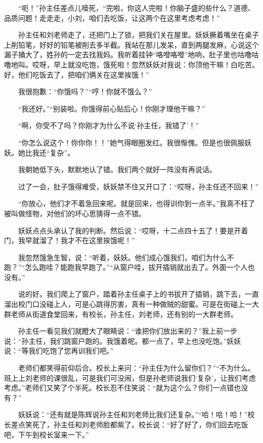  　　“呃！”孙主任差点儿噎死，“完啦，你这人完啦！你脑子盛的些什么？道德、品质问题！走走走，小刘，咱们去吃饭，让这两个在这里考虑考虑！” 
 
 　　孙主任和刘老师走了，还把门上了锁，把我们关在屋里。妖妖撅着嘴坐在桌子上削铅笔，好好的铅笔被削去多半截。我站在那儿发呆，直到两腿发麻，心说这个漏子捅大了，姓孙的一定去找我妈。我听着挂钟“咯噔咯噔”地响，肚子里也咕噜咕噜地叫。哎呀，早上就没吃饱，饿死啦！忽然妖妖对我说：你顶他干嘛！白吃苦。好，他们吃饭去了，把咱们俩关在这里挨饿！” 
 
 　　我很抱歉：“你饿吗？”“哼！你就不饿么？” 
 
 　　“我还好。”“别装啦。你饿得前心贴后心！你刚才理他干嘛？” 
 
 　　“啊，你受不了吗？你刚才为什么不说‘孙主任，我错了’！” 
 
 　　“你怎么说这个！你你你！！”她气得眼圈发红。我很惭愧。但是也很佩服妖妖。她比我还“复杂”。 
 
 　　我朝她低下头，默默地认了错。我们两个就好一阵没有再说话。 
 
 　　过了一会，肚子饿得难受，妖妖禁不住又开口了：“哎呀，孙主任还不回来！” 
 
 　　“你放心，他们才不着急回来呢。就是回来，也得训你到一点半。”我真不枉了被叫做怪物，对他们的坏心思猜得一点不错。 
 
 　　妖妖点点头承认了我的判断。然后说：“哎呀，十二点四十五了！要是开着门，我早就溜了！我才不在这里挨饿呢！” 
 
 　　我忽然饿急生智，说：“听着，妖妖。他们成心饿我们，咱们为什么不跑？”“怎么跑哇？能跑我早跑了。”“从窗户哇，拔开插销就出去了。外面一个人也没有。” 
 
 　　说的好。我们爬上了窗户，踏着孙主任桌子上的书拔开了插销，跳下去，一直溜出校门口没碰上人，可是心跳得厉害，真有一种做贼的甜蜜。可是在街碰上一大群老师从街道食堂回来，有校长，孙主任，刘老师，还有别的一大群老师。 
 
 　　孙主任一看见我们就瞪大了眼睛说：“谁把你们放出来的？”我上前一步说：“孙主任，我们跳窗户跑的。我饿着呢。都一点了，早上也没吃饱。”妖妖说：“等我们吃饱了您再训我们吧。” 
 
 　　老师们都笑得前仰后合。校长上来问：“孙主任为什么留你们？”“不为什么。班上上刘老师的课很乱，可是我们可没闹，但是孙老师说我们‘复杂’，让我们考虑考虑。”老师们又笑了个半死。校长忍不住笑说：“就为这个么？你们一点错也没有？” 
 
 　　妖妖说：“还有就是陈辉说孙主任和刘老师比我们还复杂。”“哈！哈！哈！”校长差点笑死了，孙主任和刘老师脸都紫了。校长说：“好了好了，你们回去吃饭吧，下午到校长室来一下。” 
 
